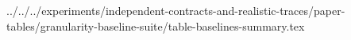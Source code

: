 ../../../experiments/independent-contracts-and-realistic-traces/paper-tables/granularity-baseline-suite/table-baselines-summary.tex